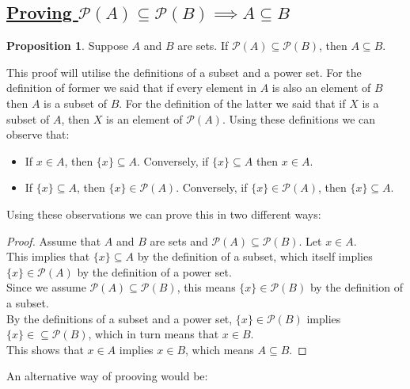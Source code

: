 \documentclass{amsart} %
\theoremstyle{definition} %
\theoremstyle{definition}
\newtheorem*{prpn}{Proposition}
\theoremstyle{remark} %
\begin{document}
\bigskip \bigskip

\subsection{\underline{Proving $ \mathcal{P}(A) \subseteq \mathcal{P}(B) \implies A \subseteq B$}}

\begin{prpn}
      Suppose $A$ and $B$ are sets. If $\mathcal{P}(A) \subseteq \mathcal{P}(B)$, then $A \subseteq B$.
\end{prpn}

This proof will utilise the definitions of a subset and a power set. For the definition of former we said that if every element in $A$ is also an element of $B$ then $A$ is a subset of $B$. For the definition of the latter we said that if $X$ is a subset of $A$, then $X$ is an element of $\mathcal{P}(A)$. Using these definitions we can observe that:
\begin{itemize}
      \item If $x \in A$, then $\{x\} \subseteq A$. Conversely, if $\{x\} \subseteq A$ then $x \in A$.
      \item If $\{x\} \subseteq A$, then $\{x\} \in \mathcal{P}(A)$. Conversely, if $\{x\} \in \mathcal{P}(A)$, then $\{x\} \subseteq A$.
\end{itemize}

Using these observations we can prove this in two different ways:

\begin{proof}
      \indent Assume that $A$ and $B$ are sets and $\mathcal{P}(A) \subseteq \mathcal{P}(B)$. Let $x \in A$. \\
      \indent This implies that $\{x\} \subseteq A$ by the definition of a subset, which itself implies $\{x\} \in \mathcal{P}(A)$ by the definition of a power set. \\
      \indent Since we assume $\mathcal{P}(A) \subseteq \mathcal{P}(B)$, this means $\{x\} \in \mathcal{P}(B)$ by the definition of a subset. \\
      \indent By the definitions of a subset and a power set, $\{x\} \in \mathcal{P}(B)$ implies $\{x\} \in \subseteq \mathcal{P}(B)$, which in turn means that $x \in B$. \\
      \indent This shows that $x \in A$ implies $x \in B$, which means $A \subseteq B$.
\end{proof}

\noindent An alternative way of prooving would be:
\end{document}
